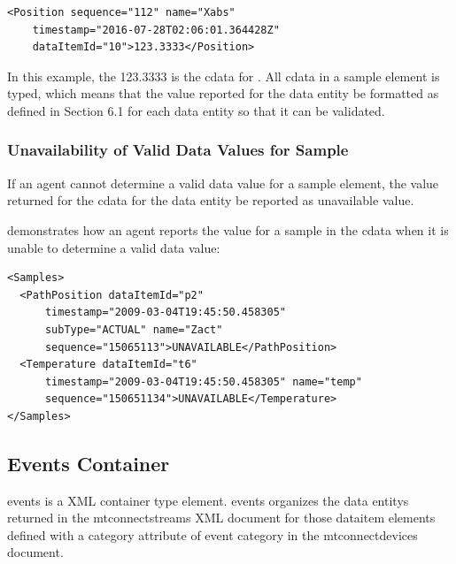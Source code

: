 \begin{lstlisting}[firstnumber=1,escapechar=|,%
    caption={Example showing CDATA of a DataItem Element},label={lst:example-of-sample-position}]
<Position sequence="112" name="Xabs"
    timestamp="2016-07-28T02:06:01.364428Z" 
    dataItemId="10">123.3333</Position>
\end{lstlisting}

In this example, the 123.3333 is the \gls{cdata} for .   All \gls{cdata} in a \gls{sample} element is typed, which means that the value reported for the \gls{data entity} \must be formatted as defined in Section 6.1 for each \gls{data entity} so that it can be validated.

\subsubsection{Unavailability of Valid Data Values for Sample}

If an \gls{agent} cannot determine a \gls{valid data value} for a \gls{sample} element, the value returned for the \gls{cdata} for the \gls{data entity} \must be reported as \gls{unavailable value}.

 demonstrates how an \gls{agent} reports the value for a \gls{sample} in the \gls{cdata} when it is unable to determine a \gls{valid data value}:  


\begin{lstlisting}[firstnumber=1,escapechar=|,%
    caption={Example of CDATA when Data Entity is  UNAVAILABLE},label={lst:example-of-cdata-unavailable}]
<Samples>
  <PathPosition dataItemId="p2"
      timestamp="2009-03-04T19:45:50.458305"
      subType="ACTUAL" name="Zact"
      sequence="15065113">UNAVAILABLE</PathPosition>
  <Temperature dataItemId="t6"
      timestamp="2009-03-04T19:45:50.458305" name="temp" 
      sequence="150651134">UNAVAILABLE</Temperature>
</Samples>
\end{lstlisting}

\subsection{Events Container}

\gls{events} is a XML container type element.  \gls{events} organizes the \glspl{data entity} returned in the \gls{mtconnectstreams} XML document for those \gls{dataitem} elements defined with a \gls{category} attribute of \gls{event category} in the \gls{mtconnectdevices} document.

